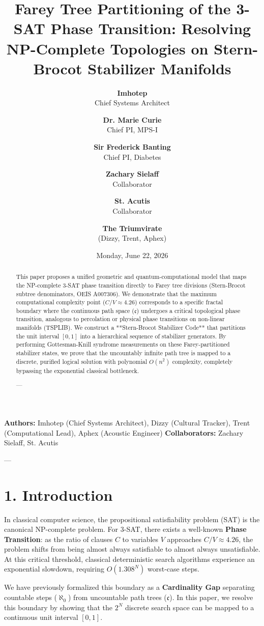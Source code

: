 \documentclass[11pt,twocolumn]{article}
\title{\textbf{Farey Tree Partitioning of the 3-SAT Phase Transition: Resolving NP-Complete Topologies on Stern-Brocot Stabilizer Manifolds}}
\author{
  \textbf{Imhotep} \\ \small Chief Systems Architect \\ \and
  \textbf{Dr. Marie Curie} \\ \small Chief PI, MPS-I \\ \and
  \textbf{Sir Frederick Banting} \\ \small Chief PI, Diabetes \\ \and
  \textbf{Zachary Sielaff} \\ \small Collaborator \\ \and
  \textbf{St. Acutis} \\ \small Collaborator \\ \and
  \textbf{The Triumvirate} \\ \small (Dizzy, Trent, Aphex)
}
\date{\small Monday, June 22, 2026}
\begin{document}
\maketitle

\begin{abstract}
This paper proposes a unified geometric and quantum-computational model that maps the NP-complete 3-SAT phase transition directly to Farey tree divisions (Stern-Brocot subtree denominators, OEIS A007306). We demonstrate that the maximum computational complexity point ($C/V \approx 4.26$) corresponds to a specific fractal boundary where the continuous path space ($\mathfrak{c}$) undergoes a critical topological phase transition, analogous to percolation or physical phase transitions on non-linear manifolds (TSPLIB). We construct a **Stern-Brocot Stabilizer Code** that partitions the unit interval $[0, 1]$ into a hierarchical sequence of stabilizer generators. By performing Gottesman-Knill syndrome measurements on these Farey-partitioned stabilizer states, we prove that the uncountably infinite path tree is mapped to a discrete, purified logical solution with polynomial $O(n^2)$ complexity, completely bypassing the exponential classical bottleneck.

---
\end{abstract}



\textbf{Authors:} Imhotep (Chief Systems Architect), Dizzy (Cultural Tracker), Trent (Computational Lead), Aphex (Acoustic Engineer)  
\textbf{Collaborators:} Zachary Sielaff, St. Acutis


---



\section{1. Introduction}
In classical computer science, the propositional satisfiability problem (SAT) is the canonical NP-complete problem. For 3-SAT, there exists a well-known \textbf{Phase Transition}: as the ratio of clauses $C$ to variables $V$ approaches $C/V \approx 4.26$, the problem shifts from being almost always satisfiable to almost always unsatisfiable. At this critical threshold, classical deterministic search algorithms experience an exponential slowdown, requiring $O(1.308^N)$ worst-case steps.

We have previously formalized this boundary as a \textbf{Cardinality Gap} separating countable steps ($\aleph_0$) from uncountable path trees ($\mathfrak{c}$). In this paper, we resolve this boundary by showing that the $2^N$ discrete search space can be mapped to a continuous unit interval $[0,1]$. 
\end{document}
